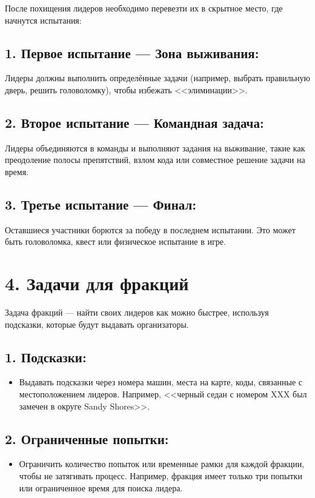 \documentclass[12pt]{article}
\begin{document}
После похищения лидеров необходимо перевезти их в скрытное место, где начнутся испытания:

\subsection*{1. Первое испытание — Зона выживания:}
Лидеры должны выполнить определённые задачи (например, выбрать правильную дверь, решить головоломку), чтобы избежать <<элиминации>>.

\subsection*{2. Второе испытание — Командная задача:}
Лидеры объединяются в команды и выполняют задания на выживание, такие как преодоление полосы препятствий, взлом кода или совместное решение задачи на время.

\subsection*{3. Третье испытание — Финал:}
Оставшиеся участники борются за победу в последнем испытании. Это может быть головоломка, квест или физическое испытание в игре.

\section*{4. Задачи для фракций}

Задача фракций — найти своих лидеров как можно быстрее, используя подсказки, которые будут выдавать организаторы.

\subsection*{1. Подсказки:}
\begin{itemize}
    \item Выдавать подсказки через номера машин, места на карте, коды, связанные с местоположением лидеров. Например, <<черный седан с номером XXX был замечен в округе Sandy Shores>>.
\end{itemize}

\subsection*{2. Ограниченные попытки:}
\begin{itemize}
    \item Ограничить количество попыток или временные рамки для каждой фракции, чтобы не затягивать процесс. Например, фракция имеет только три попытки или ограниченное время для поиска лидера.
\end{itemize}
\end{document}
